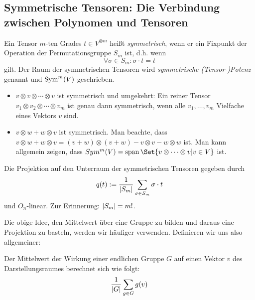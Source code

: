 \subsection{Symmetrische Tensoren: Die Verbindung zwischen Polynomen und Tensoren}

\begin{definition}\label{symmetrische_tensoren:def}
Ein Tensor $m$-ten Grades $t\in V^{\otimes m}$ heißt \emph{symmetrisch}, wenn er ein Fixpunkt der Operation der Permutationsgruppe $S_m$ ist, d.h. wenn
\[\forall \sigma\in S_m: \sigma\cdot t = t\]
gilt. Der Raum der symmetrischen Tensoren wird \emph{symmetrische (Tensor-)Potenz} genannt und $\operatorname{Sym}^m(V)$ geschrieben.
\end{definition}

\begin{example}
\begin{itemize}
\item $v\otimes v\otimes \cdots\otimes v$ ist symmetrisch und umgekehrt: Ein reiner Tensor $v_1\otimes v_2\otimes\cdots\otimes v_m$ ist genau dann symmetrisch, wenn alle $v_1,\ldots, v_m$ Vielfache eines Vektors $v$ sind.
\item $v\otimes w + w\otimes v$ ist symmetrisch. Man beachte, dass $v\otimes w + w\otimes v = (v+w)\otimes(v+w) - v\otimes v - w\otimes w$ ist. Man kann allgemein zeigen, dass $Sym^m(V) = \operatorname{span}\Set{v\otimes\cdots\otimes v | v\in V}$ ist.
\end{itemize}
\end{example}

\begin{lemma}[Mittelwerttrick]\label{symmetrische_tensoren:projektion}
Die Projektion auf den Unterraum der symmetrischen Tensoren gegeben durch
\[q(t) := \frac{1}{\lvert S_m\rvert} \sum_{\sigma\in S_m} \sigma\cdot t\]
und $O_n$-linear. Zur Erinnerung: $\lvert S_m\rvert = m!$.
\end{lemma}
Die obige Idee, den Mittelwert über eine Gruppe zu bilden und daraus eine Projektion zu basteln, werden wir häufiger verwenden. Definieren wir uns also allgemeiner:
\begin{definition}
	Der Mittelwert der Wirkung einer endlichen Gruppe $G$ auf einen Vektor $v$ des Darstellungsraumes berechnet sich wie folgt:
	\[
		\frac{1}{\lvert G\rvert} \sum_{g\in G} g(v)
	\]
\end{definition}

